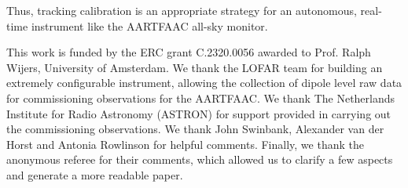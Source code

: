 \documentclass{aa}
\begin{document}
Thus,  tracking calibration  is an appropriate  strategy for  an autonomous,
real-time instrument like the \mbox{AARTFAAC} all-sky monitor.

\begin {acknowledgements}
This work is funded by the ERC grant C.2320.0056 awarded to Prof.  Ralph Wijers,
University  of Amsterdam.  We  thank the  LOFAR team  for building  an extremely
configurable instrument,  allowing the collection  of dipole level raw  data for
commissioning observations  for the  \mbox{AARTFAAC}.  We thank  The Netherlands
Institute for Radio Astronomy (ASTRON)  for support provided in carrying out the
commissioning observations. We thank John  Swinbank, Alexander van der Horst and
Antonia Rowlinson for helpful comments.  Finally, we thank the anonymous referee
for their  comments, which allowed  us to clarify  a few aspects and  generate a
more readable paper.
\end{acknowledgements}


\end{document}
